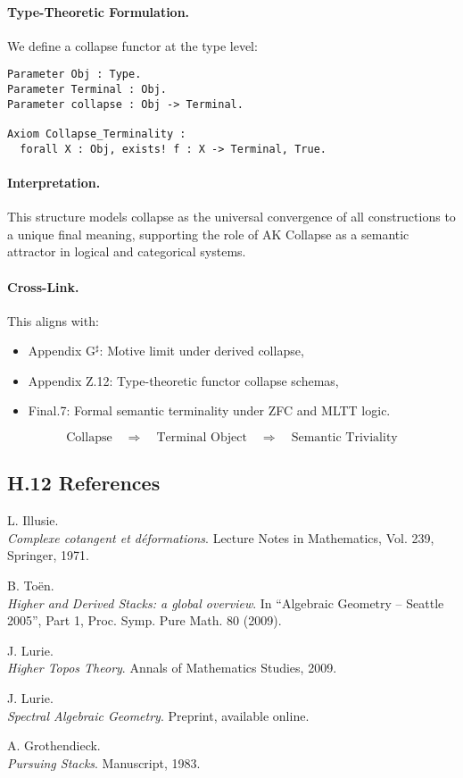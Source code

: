\documentclass[11pt]{article}
\begin{document}
\paragraph{Type-Theoretic Formulation.}
We define a collapse functor at the type level:

\begin{lstlisting}[language=Coq]
Parameter Obj : Type.
Parameter Terminal : Obj.
Parameter collapse : Obj -> Terminal.

Axiom Collapse_Terminality :
  forall X : Obj, exists! f : X -> Terminal, True.
\end{lstlisting}

\paragraph{Interpretation.}
This structure models collapse as the universal convergence of all constructions to a unique final meaning,
supporting the role of AK Collapse as a semantic attractor in logical and categorical systems.

\paragraph{Cross-Link.}
This aligns with:
\begin{itemize}
  \item Appendix G$^\sharp$: Motive limit under derived collapse,
  \item Appendix Z.12: Type-theoretic functor collapse schemas,
  \item Final.7: Formal semantic terminality under ZFC and MLTT logic.
\end{itemize}

\[
\boxed{
\text{Collapse} \quad \Rightarrow \quad \text{Terminal Object} \quad \Rightarrow \quad \text{Semantic Triviality}
}
\]

\subsection*{H.12 References}

\begin{thebibliography}{9}

L. Illusie.\\
\textit{Complexe cotangent et déformations}.  
Lecture Notes in Mathematics, Vol. 239, Springer, 1971.

B. Toën.\\
\textit{Higher and Derived Stacks: a global overview}.  
In “Algebraic Geometry – Seattle 2005”, Part 1, Proc. Symp. Pure Math. 80 (2009).

J. Lurie.\\
\textit{Higher Topos Theory}.  
Annals of Mathematics Studies, 2009.

J. Lurie.\\
\textit{Spectral Algebraic Geometry}.  
Preprint, available online.

A. Grothendieck.\\
\textit{Pursuing Stacks}.  
Manuscript, 1983.

\end{thebibliography}
\end{document}
